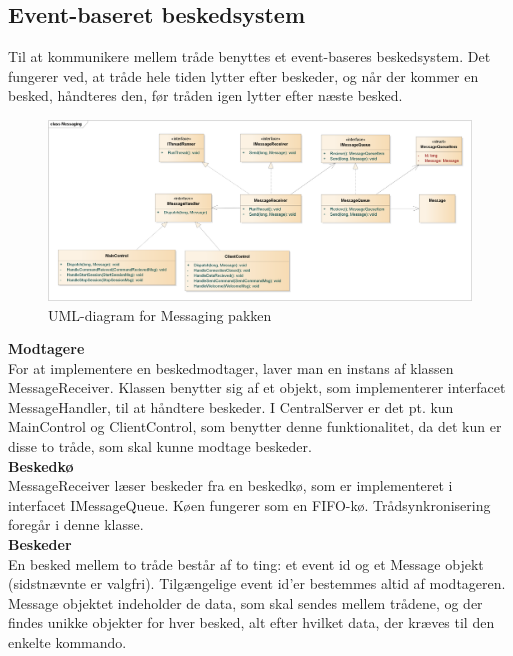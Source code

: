 \subsection{Event-baseret beskedsystem}
Til at kommunikere mellem tråde benyttes et event-baseres beskedsystem. Det fungerer ved, at tråde hele tiden lytter efter beskeder, og når der kommer en besked, håndteres den, før tråden igen lytter efter næste besked.

\begin{figure}[H]
    \centering
    \includegraphics[width=1\textwidth]{Systemdesign/CentralServer/Images/Beskedsystem.png}
    \caption{UML-diagram for Messaging pakken}
    \label{fig:CSBeskedsystem}
\end{figure}


\textbf{Modtagere}\\
For at implementere en beskedmodtager, laver man en instans af klassen MessageReceiver. Klassen benytter sig af et objekt, som implementerer interfacet MessageHandler, til at håndtere beskeder. I CentralServer er det pt. kun MainControl og ClientControl, som benytter denne funktionalitet, da det kun er disse to tråde, som skal kunne modtage beskeder.\\

\textbf{Beskedkø}\\
MessageReceiver læser beskeder fra en beskedkø, som er implementeret i interfacet IMessageQueue. Køen fungerer som en FIFO-kø. Trådsynkronisering foregår i denne klasse.\\

\textbf{Beskeder}\\
En besked mellem to tråde består af to ting: et event id og et Message objekt (sidstnævnte er valgfri). Tilgængelige event id’er bestemmes altid af modtageren. Message objektet indeholder de data, som skal sendes mellem trådene, og der findes unikke objekter for hver besked, alt efter hvilket data, der kræves til den enkelte kommando.\\

